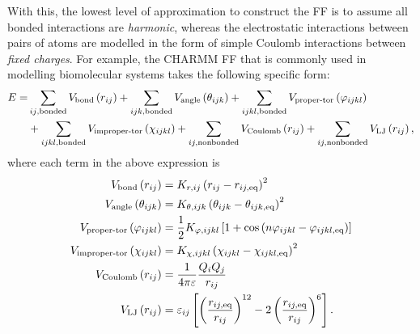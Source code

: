 With this, the lowest level of approximation to construct the FF is to assume all bonded interactions are \emph{harmonic}, whereas the electrostatic interactions between pairs of atoms are modelled in the form of simple Coulomb interactions between \textit{fixed charges}. For example, the CHARMM FF that is commonly used in modelling biomolecular systems takes the following specific form:\cite{mackerell1998all}
\begin{align}\label{eq:charmm_general}
    E=&\sum_{ij \mbox{\scriptsize{,bonded}}}V_{\mbox{\scriptsize{bond}}}\left(r_{ij}\right)
    +\sum_{ijk,\mbox{\scriptsize{bonded}}}V_{\mbox{\scriptsize{angle}}}\left(\theta_{ijk}\right)+\sum_{ijkl,\mbox{\scriptsize{bonded}}}V_{\mbox{\scriptsize{proper-tor}}}\left(\varphi_{ijkl}\right)\nonumber\\
&+\sum_{ijkl,\mbox{\scriptsize{bonded}}}V_{\mbox{\scriptsize{improper-tor}}}\left(\chi_{ijkl}\right)+\sum_{ij,\mbox{\scriptsize{nonbonded}}}V_{\mbox{\scriptsize{Coulomb}}}\left(r_{ij}\right)+\sum_{ij,\mbox{\scriptsize{nonbonded}}}V_{\mbox{\scriptsize{LJ}}}\left(r_{ij}\right),
\end{align}
where each term in the above expression is
\begin{subequations}
\begin{align}
V_{\mbox{\scriptsize{bond}}}\left(r_{ij}\right)&=K_{r,ij}\left(r_{ij}-r_{ij,\mbox{\scriptsize{eq}}}\right)^2\label{eq:bond}\\
V_{\mbox{\scriptsize{angle}}}\left(\theta_{ijk}\right)&=K_{\theta,ijk}\left(\theta_{ijk}-\theta_{ijk,\mbox{\scriptsize{eq}}}\right)^2\label{eq:angle}\\
V_{\mbox{\scriptsize{proper-tor}}}\left(\varphi_{ijkl}\right)&=\frac{1}{2}K_{\varphi,ijkl}\left[1+\cos\left(n\varphi_{ijkl}-\varphi_{ijkl,\mbox{\scriptsize{eq}}}\right)\right]\label{eq:proper_tor}\\
V_{\mbox{\scriptsize{improper-tor}}}\left(\chi_{ijkl}\right)&=K_{\chi,ijkl}\left(\chi_{ijkl}-\chi_{ijkl,\mbox{\scriptsize{eq}}}\right)^2\label{eq:improper-tor}\\
V_{\mbox{\scriptsize{Coulomb}}}\left(r_{ij}\right)&=\frac{1}{4\pi\varepsilon}\frac{Q_{i} Q_{j}}{r_{ij}}\label{eq:Coulomb}\\
V_{\mbox{\scriptsize{LJ}}}\left(r_{ij}\right)&=\varepsilon_{ij}\left[\left(\frac{r_{ij,\mbox{\scriptsize{eq}}}}{r_{ij}}\right)^{12}-2\left(\frac{r_{ij,\mbox{\scriptsize{eq}}}}{r_{ij}}\right)^{6}\right]\label{eq:LJ}.
\end{align}
\end{subequations}
